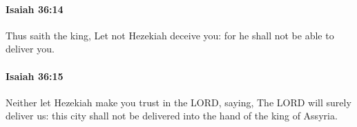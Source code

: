 		\paragraph{Isaiah 36:14} %
			\label{ISAIAH-36-14}

			Thus saith the king, Let not Hezekiah deceive you: for he shall not be able to deliver you.


		\paragraph{Isaiah 36:15} %
			\label{ISAIAH-36-15}

			Neither let Hezekiah make you trust in the LORD, saying, The LORD will surely deliver us: this city shall not be delivered into the hand of the king of Assyria.


